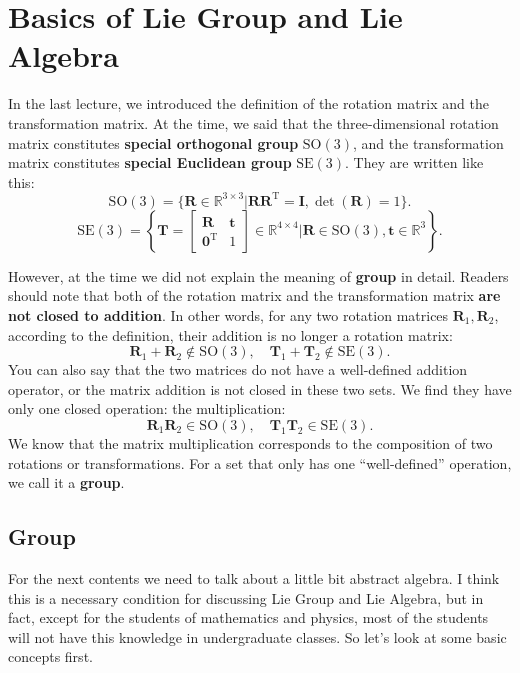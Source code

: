 \section{Basics of Lie Group and Lie Algebra}
In the last lecture, we introduced the definition of the rotation matrix and the transformation matrix. At the time, we said that the three-dimensional rotation matrix constitutes \textbf{special orthogonal group} $\mathrm{SO}(3)$, and the transformation matrix constitutes \textbf{special Euclidean group} $\mathrm{SE}(3) $. They are written like this:
\begin{equation}
\mathrm{SO}(3) = \{ \mathbf{R} \in \mathbb{R}^{3 \times 3} | \mathbf{RR}^\mathrm{T} = \mathbf{I}, \det(\mathbf{R})=1 \}.
\end{equation}
\begin{equation}
\mathrm{SE}(3) = \left\{ \mathbf{T} = \left[ {\begin{array}{*{20}{c}}
    \mathbf{R} & \mathbf{t} \\
    {{\mathbf{0}^\mathrm{T}}} & 1
    \end{array}} \right]
\in \mathbb{R}^{4 \times 4} | \mathbf{R} \in \mathrm{SO}(3), \mathbf{t} \in \mathbb{R}^3\right\}.
\end{equation}

However, at the time we did not explain the meaning of \textbf{group} in detail. Readers should note that both of the rotation matrix and the transformation matrix \textbf{are not closed to addition}. In other words, for any two rotation matrices $\mathbf{R}_1, \mathbf{R}_2$, according to the definition, their addition is no longer a rotation matrix:
\begin{equation}
\mathbf{R}_1 + \mathbf{R}_2 \notin \mathrm{SO}(3), \quad \mathbf{T}_1 + \mathbf{T}_2 \notin \mathrm{SE}(3).
\end{equation}
You can also say that the two matrices do not have a well-defined addition operator, or the matrix addition is not closed in these two sets. We find they have only one closed operation: the multiplication:
\begin{equation}
\mathbf{R}_1 \mathbf{R}_2 \in \mathrm{SO}(3), \quad \mathbf{T}_1 \mathbf{T}_2 \in \mathrm{SE}(3).
\end{equation}
We know that the matrix multiplication corresponds to the composition of two rotations or transformations. For a set that only has one ``well-defined'' operation, we call it a \textbf{group}.

\subsection{Group}
For the next contents we need to talk about a little bit abstract algebra. I think this is a necessary condition for discussing Lie Group and Lie Algebra, but in fact, except for the students of mathematics and physics, most of the students will not have this knowledge in undergraduate classes. So let's look at some basic concepts first.

